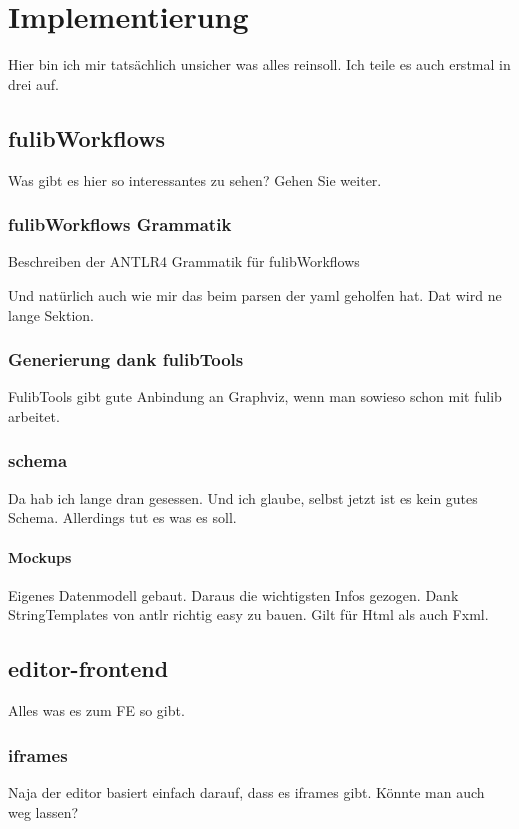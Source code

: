 \chapter{Implementierung}\label{ch:implementierung}
Hier bin ich mir tatsächlich unsicher was alles reinsoll.
Ich teile es auch erstmal in drei auf.

\section{fulibWorkflows}\label{sec:fulibworkflows2}
Was gibt es hier so interessantes zu sehen?
Gehen Sie weiter.

\subsection{fulibWorkflows Grammatik}\label{subsec:fulibworkflows-grammatik}
Beschreiben der ANTLR4 Grammatik für fulibWorkflows

Und natürlich auch wie mir das beim parsen der yaml geholfen hat.
Dat wird ne lange Sektion.

\subsection{Generierung dank fulibTools}\label{subsec:generierung-dank-fulibtools}
FulibTools gibt gute Anbindung an Graphviz, wenn man sowieso schon mit fulib arbeitet.

\subsection{schema}\label{subsec:schema}
Da hab ich lange dran gesessen.
Und ich glaube, selbst jetzt ist es kein gutes Schema.
Allerdings tut es was es soll.

\subsubsection{Mockups}
Eigenes Datenmodell gebaut.
Daraus die wichtigsten Infos gezogen.
Dank StringTemplates von antlr richtig easy zu bauen.
Gilt für Html als auch Fxml.

\section{editor-frontend}\label{sec:editor-frontend}
Alles was es zum FE so gibt.

\subsection{iframes}\label{subsec:iframes}
Naja der editor basiert einfach darauf, dass es iframes gibt.
Könnte man auch weg lassen?

